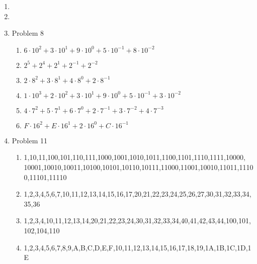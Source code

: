 \begin{enumerate}[leftmargin=2cm,labelsep=.5cm,label=\bf\arabic*.]
\item

\item

\item Problem 8
\begin{enumerate}
  \item $6 \cdot 10^2 + 3 \cdot 10^1 + 9 \cdot 10^0 + 5 \cdot 10^{-1} + 8 \cdot 10^{-2}$
  \item $2^5 + 2^4 + 2^1 + 2^{-1} + 2^{-2}$
  \item $2 \cdot 8^2 + 3 \cdot 8^1 + 4 \cdot 8^0 + 2 \cdot 8^{-1}$
  \item $1 \cdot 10^3 + 2 \cdot 10^2 + 3 \cdot 10^1 + 9 \cdot 10^0 + 5 \cdot 10^{-1} + 3 \cdot 10^{-2}$
  \item $4 \cdot 7^2 + 5 \cdot 7^1 + 6 \cdot 7^0 + 2 \cdot 7^{-1} + 3 \cdot 7^{-2} + 4 \cdot 7^{-3}$
  \item $F \cdot 16^2 + E \cdot 16^1 + 2 \cdot 16^0 + C \cdot 16^{-1}$\\[1cm]
\end{enumerate}

\item Problem 11
\begin{enumerate}
  \item 1,10,11,100,101,110,111,1000,1001,1010,1011,1100,1101,1110,1111,10000,\\
  10001,10010,10011,10100,10101,10110,10111,11000,11001,10010,11011,11100,11101,11110
  \item 1,2,3,4,5,6,7,10,11,12,13,14,15,16,17,20,21,22,23,24,25,26,27,30,31,32,33,34,35,36
  \item 1,2,3,4,10,11,12,13,14,20,21,22,23,24,30,31,32,33,34,40,41,42,43,44,100,101,102,104,110
  \item 1,2,3,4,5,6,7,8,9,A,B,C,D,E,F,10,11,12,13,14,15,16,17,18,19,1A,1B,1C,1D,1E
\end{enumerate}


\end{enumerate}
